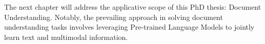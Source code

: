 The next chapter will address the applicative scope of this PhD thesis: Document Understanding. Notably, the prevailing approach in solving document understanding tasks involves leveraging Pre-trained Language Models to jointly learn text and multimodal information. 


\acresetall

